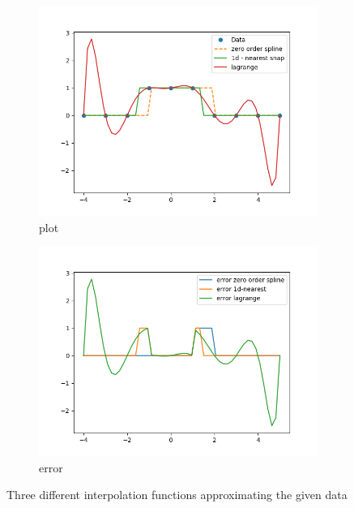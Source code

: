 \documentclass[12pt]{article}
\begin{document}
\begin{figure}[h]
	\begin{subfigure}[h]{0.5\textwidth}
		\centering
		\includegraphics[width=\textwidth]{2plot.png}
		\caption{plot}
	\end{subfigure}
	\hfill
	\begin{subfigure}[h]{0.5\textwidth}
		\centering
		\includegraphics[width=\textwidth]{2error.png}
		\caption{error}
	\end{subfigure}
	\caption{Three different interpolation functions approximating the given data}
\end{figure}
\end{document}

